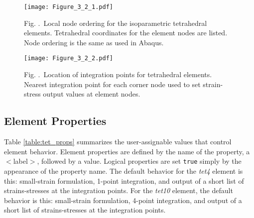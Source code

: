 \documentclass[11pt]{report}
\numberwithin{equation}{section}
\newcommand{\ttt} {\texttt}  %
\newcommand{\ti}{\emph}
\newcommand{\tfour}{\ti{tet4}\xspace}
\newcommand{\tten}{\ti{tet10}\xspace}
\renewcommand{\thefigure}{\thesection.\arabic{figure}}
\begin{document}
%
\begin{figure}
\begin{center}
\texttt{[image: Figure\_3\_2\_1.pdf]} 
\caption{{\small Fig. \thefigure\ Local node ordering for the isoparametric tetrahedral elements. 
Tetrahedral coordinates for the element nodes are listed. Node ordering is the same as used in Abaqus.}
\label{fig:tet1}}
%
\end{center}
\end{figure}
%


%
\begin{figure}
\begin{center}
\texttt{[image: Figure\_3\_2\_2.pdf]} 

\caption{\small{Fig. \thefigure\ Location of integration points for tetrahedral elements. Nearest integration 
point for each corner node used to set strain-stress output values at element nodes.}
\label{fig:tet2}}
%
\end{center}
\end{figure}
%

\subsection {Element Properties}

Table \ref{table:tet_props} summarizes the user-assignable values that 
control element behavior.
Element properties are defined by the name of the property, a $<$label$>$,
followed by a value. Logical properties are set \ttt{true} simply by the appearance
of the property name. The default behavior for the \tfour element is this:
small-strain formulation, 1-point integration, and output of a short list of
strains-stresses at the integration points. For the \tten element, the default
behavior is this: small-strain formulation, 4-point integration, and output of a
short list of strains-stresses at the integration points. 
\end{document}
